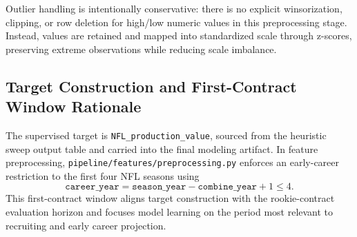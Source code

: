 Outlier handling is intentionally conservative: there is no explicit winsorization, clipping, or row deletion for high/low numeric values in this preprocessing stage. Instead, values are retained and mapped into standardized scale through z-scores, preserving extreme observations while reducing scale imbalance.

\subsection{Target Construction and First-Contract Window Rationale}

The supervised target is \texttt{NFL\_production\_value}, sourced from the heuristic sweep output table and carried into the final modeling artifact. In feature preprocessing, \texttt{pipeline/features/preprocessing.py} enforces an early-career restriction to the first four NFL seasons using
\[
\texttt{career\_year} = \texttt{season\_year} - \texttt{combine\_year} + 1 \le 4.
\]
This first-contract window aligns target construction with the rookie-contract evaluation horizon and focuses model learning on the period most relevant to recruiting and early career projection.
